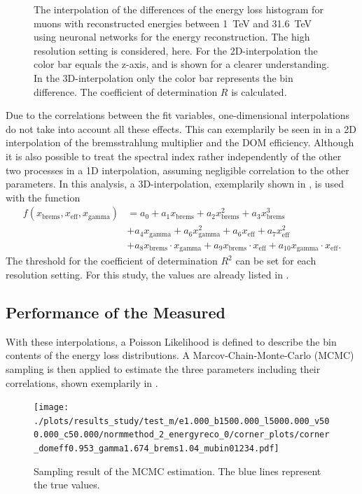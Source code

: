 \begin{figure}
\begin{subfigure}{0.47\textwidth}
        \label{fig:study_interpol_3d_show}
    \end{subfigure}
    \caption{The interpolation of the differences of the energy loss histogram for muons with reconstructed energies between \SI{1}{TeV} and \SI{31.6}{TeV} using neuronal networks for the energy reconstruction. The high resolution setting is considered, here. For the 2D-interpolation the color bar equals the z-axis, and is shown for a clearer understanding. In the 3D-interpolation only the color bar represents the bin difference.
    The coefficient of determination $R$ is calculated.}
    \label{fig:study_interpol_show}
\end{figure}

Due to the correlations between the fit variables, one-dimensional interpolations do not take into account all these effects.
This can exemplarily be seen in  in a 2D interpolation of the bremsstrahlung multiplier and the DOM efficiency.
Although it is also possible to treat the spectral index rather independently of the other two processes in a 1D interpolation, assuming negligible correlation to the other parameters.
In this analysis, a 3D-interpolation, exemplarily shown in , is used with the function
\begin{align}
    f(x_{\text{brems}}, x_{\text{eff}}, x_{\text{gamma}}) 
        &= a_0
        + a_1 x_{\text{brems}} + a_2 x_{\text{brems}}^2 + a_3 x_{\text{brems}}^3 \nonumber \\
        &+ a_4 x_{\text{gamma}} + a_6 x_{\text{gamma}}^2
        + a_6 x_{\text{eff}} + a_7 x_{\text{eff}}^2 \\
        &+ a_8 x_{\text{brems}} \cdot x_{\text{gamma}}
        + a_9 x_{\text{brems}} \cdot x_{\text{eff}}
        + a_{10} x_{\text{gamma}} \cdot x_{\text{eff}} .\nonumber
\end{align}
The threshold for the coefficient of determination $R^2$ can be set for each resolution setting.
For this study, the values are already listed in .

%

\subsection{Performance of the Measured}

With these interpolations, a Poisson Likelihood is defined to describe the bin contents of the energy loss distributions.
A Marcov-Chain-Monte-Carlo (MCMC) sampling is then applied to estimate the three parameters including their correlations, shown exemplarily in .
\begin{figure}
    \centering
    \texttt{[image: ./plots/results\_study/test\_m/e1.000\_b1500.000\_l5000.000\_v500.000\_c50.000/normmethod\_2\_energyreco\_0/corner\_plots/corner\_domeff0.953\_gamma1.674\_brems1.04\_mubin01234.pdf]}
    \caption{Sampling result of the MCMC estimation. The blue lines represent the true values.}
    \label{fig:study_mcmc_show}
\end{figure}

